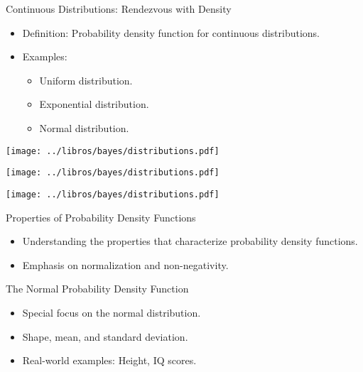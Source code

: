 \documentclass{beamer}
\begin{document}
\begin{frame}{Continuous Distributions: Rendezvous with Density}
  \begin{itemize}
    \item Definition: Probability density function for continuous distributions.
    \item Examples:
      \begin{itemize}
        \item Uniform distribution.
        \item Exponential distribution.
        \item Normal distribution.
      \end{itemize}
  \end{itemize}
\end{frame}


\begin{frame}
\begin{center}
  \texttt{[image: ../libros/bayes/distributions.pdf]}
  \end{center}
\end{frame}

\begin{frame}
\begin{center}
  \texttt{[image: ../libros/bayes/distributions.pdf]}
  \end{center}
\end{frame}

\begin{frame}
\begin{center}
  \texttt{[image: ../libros/bayes/distributions.pdf]}
  \end{center}
\end{frame}


\begin{frame}{Properties of Probability Density Functions}
  \begin{itemize}
    \item Understanding the properties that characterize probability density functions.
    \item Emphasis on normalization and non-negativity.
  \end{itemize}
\end{frame}

\begin{frame}{The Normal Probability Density Function}
  \begin{itemize}
    \item Special focus on the normal distribution.
    \item Shape, mean, and standard deviation.
    \item Real-world examples: Height, IQ scores.
  \end{itemize}
\end{frame}
\end{document}
